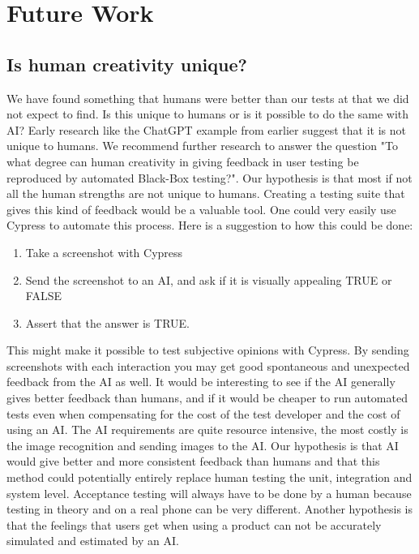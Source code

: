 \documentclass[journal,twocolumn]{IEEEtran}
\begin{document}
\section{Future Work}
\subsection{Is human creativity unique?}
We have found something that humans were better than our tests at that we did not expect to find. Is this unique to humans or is it possible to do the same with AI? Early research like the ChatGPT example from earlier suggest that it is not unique to humans. We recommend further research to answer the question "To what degree can human creativity in giving feedback in user testing be reproduced by automated Black-Box testing?". Our hypothesis is that most if not all the human strengths are not unique to humans. Creating a testing suite that gives this kind of feedback would be a valuable tool. One could very easily use Cypress to automate this process. Here is a suggestion to how this could be done:

\begin{enumerate}
    \item Take a screenshot with Cypress
    \item Send the screenshot to an AI, and ask if it is visually appealing TRUE or FALSE
    \item Assert that the answer is TRUE.
\end{enumerate}

This might make it possible to test subjective opinions with Cypress. By sending screenshots with each interaction you may get good spontaneous and unexpected feedback from the AI as well. It would be interesting to see if the AI generally gives better feedback than humans, and if it would be cheaper to run automated tests even when compensating for the cost of the test developer and the cost of using an AI. The AI requirements are quite resource intensive, the most costly is the image recognition and sending images to the AI. Our hypothesis is that AI would give better and more consistent feedback than humans and that this method could potentially entirely replace human testing the unit, integration and system level. Acceptance testing will always have to be done by a human because testing in theory and on a real phone can be very different. Another hypothesis is that the feelings that users get when using a product can not be accurately simulated and estimated by an AI.
\end{document}
